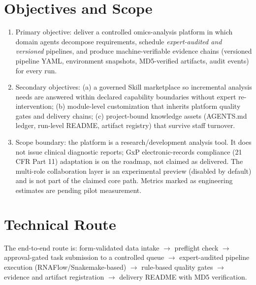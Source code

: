 \documentclass[11pt,a4paper]{article}
\begin{document}
\section{Objectives and Scope}
\begin{enumerate}
  \item Primary objective: deliver a controlled omics-analysis platform in which domain agents decompose requirements, schedule \emph{expert-audited and versioned} pipelines, and produce machine-verifiable evidence chains (versioned pipeline YAML, environment snapshots, MD5-verified artifacts, audit events) for every run.
  \item Secondary objectives: (a) a governed Skill marketplace so incremental analysis needs are answered within declared capability boundaries without expert re-intervention; (b) module-level customization that inherits platform quality gates and delivery chains; (c) project-bound knowledge assets (AGENTS.md ledger, run-level README, artifact registry) that survive staff turnover.
  \item Scope boundary: the platform is a research/development analysis tool. It does not issue clinical diagnostic reports; GxP electronic-records compliance (21 CFR Part 11) adaptation is on the roadmap, not claimed as delivered. The multi-role collaboration layer is an experimental preview (disabled by default) and is not part of the claimed core path. Metrics marked as engineering estimates are pending pilot measurement.
\end{enumerate}

\section{Technical Route}

The end-to-end route is: form-validated data intake $\rightarrow$ preflight check $\rightarrow$ approval-gated task submission to a controlled queue $\rightarrow$ expert-audited pipeline execution (RNAFlow/Snakemake-based) $\rightarrow$ rule-based quality gates $\rightarrow$ evidence and artifact registration $\rightarrow$ delivery README with MD5 verification.
\end{document}
